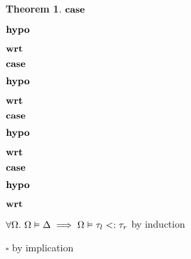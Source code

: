\documentclass[acmsmall]{acmart}
\theoremstyle{definition}
\newtheorem{theorem}{Theorem}[section]
\begin{document}
\begin{theorem}
    \item \Z $\textbf{case } $
    \item \Z $\textbf{hypo } $
    \item \Z $\textbf{wrt } $
      \item \Z\Z {} 

    \item \Z $\textbf{case } $
    \item \Z $\textbf{hypo } $
    \item \Z $\textbf{wrt } $
      \item \Z\Z {} 

    \item \Z $\textbf{case } $
    \item \Z $\textbf{hypo } $
    \item \Z $\textbf{wrt } $

      \item \Z\Z {} 

    \item \Z $\textbf{case } $
    \item \Z $\textbf{hypo } $
    \item \Z $\textbf{wrt } $
      \item \Z\Z {} 

    \item \Z $\forall \Omega .\ \Omega \vDash \Delta \implies \Omega \vDash \tau_l <: \tau_r$ 
    by induction
  \item $\square$ by implication
\end{theorem}
\end{document}
